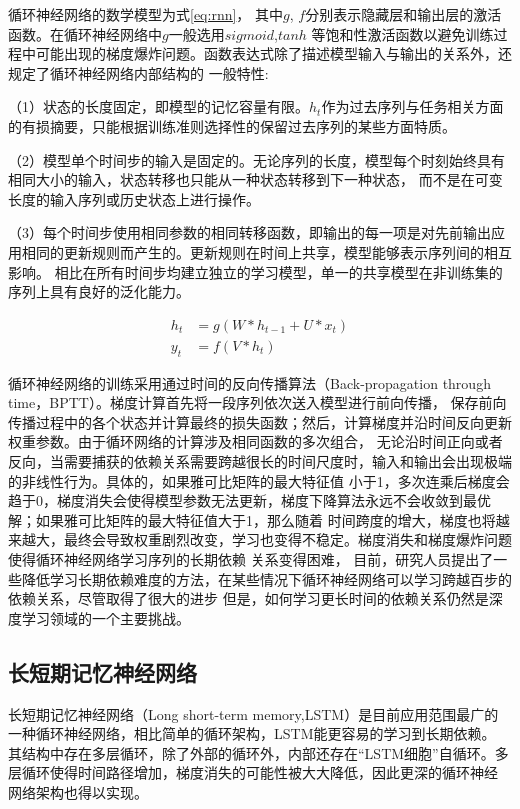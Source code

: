 循环神经网络的数学模型为式\ref{eq:rnn}， 其中\(g\), \(f\)分别表示隐藏层和输出层的激活函数。在循环神经网络中\(g\)一般选用\(sigmoid\),\(tanh\)
等饱和性激活函数以避免训练过程中可能出现的梯度爆炸问题。函数表达式除了描述模型输入与输出的关系外，还规定了循环神经网络内部结构的
一般特性:

（1）状态的长度固定，即模型的记忆容量有限。\(h_t\)作为过去序列与任务相关方面的有损摘要，只能根据训练准则选择性的保留过去序列的某些方面特质。

（2）模型单个时间步的输入是固定的。无论序列的长度，模型每个时刻始终具有相同大小的输入，状态转移也只能从一种状态转移到下一种状态，
而不是在可变长度的输入序列或历史状态上进行操作。

（3）每个时间步使用相同参数的相同转移函数，即输出的每一项是对先前输出应用相同的更新规则而产生的。更新规则在时间上共享，模型能够表示序列间的相互影响。
相比在所有时间步均建立独立的学习模型，单一的共享模型在非训练集的序列上具有良好的泛化能力。

\begin{equation}\label{eq:rnn}
	\begin{split}
		h_{t} &= g(W*h_{t-1} + U*x_{t})	\\
		y_{t} &= f(V*h_{t})						
	\end{split}
\end{equation}

循环神经网络的训练采用通过时间的反向传播算法（Back-propagation through time，BPTT）。梯度计算首先将一段序列依次送入模型进行前向传播，
保存前向传播过程中的各个状态并计算最终的损失函数；然后，计算梯度并沿时间反向更新权重参数。由于循环网络的计算涉及相同函数的多次组合，
无论沿时间正向或者反向，当需要捕获的依赖关系需要跨越很长的时间尺度时，输入和输出会出现极端的非线性行为。具体的，如果雅可比矩阵的最大特征值
小于1，多次连乘后梯度会趋于0，梯度消失会使得模型参数无法更新，梯度下降算法永远不会收敛到最优解；如果雅可比矩阵的最大特征值大于1，那么随着
时间跨度的增大，梯度也将越来越大，最终会导致权重剧烈改变，学习也变得不稳定。梯度消失和梯度爆炸问题使得循环神经网络学习序列的长期依赖
关系变得困难， 目前，研究人员提出了一些降低学习长期依赖难度的方法，在某些情况下循环神经网络可以学习跨越百步的依赖关系，尽管取得了很大的进步
但是，如何学习更长时间的依赖关系仍然是深度学习领域的一个主要挑战。


\subsection{长短期记忆神经网络}
长短期记忆神经网络（Long short-term memory,LSTM）是目前应用范围最广的一种循环神经网络，相比简单的循环架构，LSTM能更容易的学习到长期依赖。
其结构中存在多层循环，除了外部的循环外，内部还存在“LSTM细胞”自循环。多层循环使得时间路径增加，梯度消失的可能性被大大降低，因此更深的循环神经
网络架构也得以实现\citing{}。

